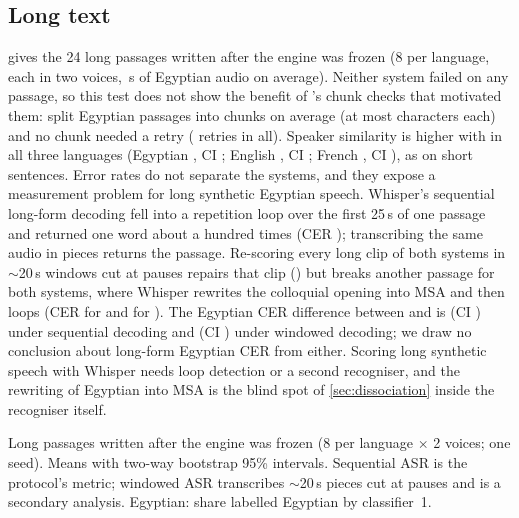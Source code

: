 \subsection{Long text}
 gives the 24 long passages written after the engine was frozen (8 per language, each in two voices,
\,s of Egyptian audio on average). Neither system failed on any passage, so this test does not
show the benefit of \BA's chunk checks that motivated them: \BA split Egyptian passages into
 chunks on average (at most  characters each) and no chunk needed a retry
( retries in all). Speaker similarity is higher with \BA in
all three languages (Egyptian , CI ; English
, CI ; French , CI ),
as on short sentences. Error rates do not separate the systems, and they expose a measurement problem for long
synthetic Egyptian speech. Whisper's sequential long-form decoding fell into a repetition loop over the first 25\,s of
one \BA passage and returned one word about a hundred times (CER ); transcribing the same
audio in pieces returns the passage. Re-scoring every long clip of both systems in $\sim$20\,s windows cut at pauses
repairs that clip () but breaks another passage for both systems, where Whisper rewrites the
colloquial opening into MSA and then loops (CER  for \BA and
 for \vox). The Egyptian CER difference between \BA and \vox is
 (CI ) under sequential decoding and 
(CI ) under windowed decoding; we draw no conclusion about long-form Egyptian CER from either.
Scoring long synthetic speech with Whisper needs loop detection or a second recogniser, and the rewriting of Egyptian
into MSA is the blind spot of \cref{sec:dissociation} inside the recogniser itself.

\begin{table}[t]
\centering\small
\caption{Long passages written after the engine was frozen (8 per language $\times$ 2 voices; one seed). Means with
two-way bootstrap 95\% intervals. Sequential ASR is the protocol's metric; windowed ASR transcribes $\sim$20\,s pieces
cut at pauses and is a secondary analysis. Egyptian: share labelled Egyptian by classifier~1.}
\label{tab:long}
\begin{adjustbox}{max width=\linewidth}
\end{adjustbox}
\end{table}

